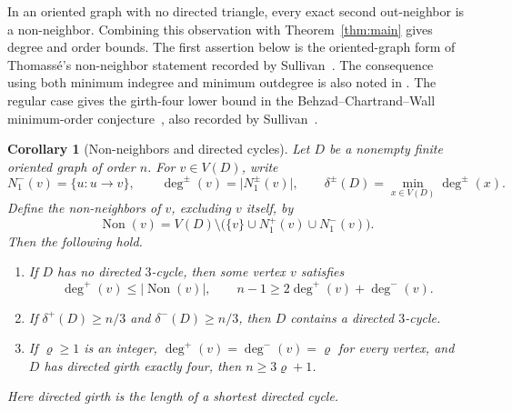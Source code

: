 \documentclass[11pt]{article}
\newtheorem{corollary}[theorem]{Corollary}
\theoremstyle{remark}
\newcommand{\abs}[1]{\lvert #1\rvert}
\DeclareMathOperator{\Non}{Non}
\begin{document}
In an oriented graph with no directed triangle, every exact second
out-neighbor is a non-neighbor. Combining this observation with
Theorem~\ref{thm:main} gives degree and order bounds.
The first assertion below is the oriented-graph form of Thomass\'e's
non-neighbor statement recorded by
Sullivan~\cite[Conjecture~6.12]{Sullivan2006}.
The consequence using both minimum indegree and minimum outdegree is also
noted in \cite[Section~3]{Sullivan2006}. The regular case gives the
girth-four lower bound in the Behzad--Chartrand--Wall minimum-order
conjecture~\cite{BehzadChartrandWall1970}, also recorded by
Sullivan~\cite[Section~4]{Sullivan2006}.

\begin{corollary}[Non-neighbors and directed cycles]\label{cor:directed-cycle-consequences}
Let \(D\) be a nonempty finite oriented graph of order \(n\). For
\(v\in V(D)\), write
\[
 N_1^-(v)=\{u:u\to v\},\qquad
 \deg^\pm(v)=\abs{N_1^\pm(v)},\qquad
 \delta^\pm(D)=\min_{x\in V(D)}\deg^\pm(x).
\]
Define the non-neighbors of \(v\), excluding \(v\) itself, by
\[
 \Non(v)=V(D)\setminus
 \bigl(\{v\}\cup N_1^+(v)\cup N_1^-(v)\bigr).
\]
Then the following hold.
\begin{enumerate}[label=\textup{(\roman*)}]
\item If \(D\) has no directed \(3\)-cycle, then some vertex \(v\) satisfies
\[
 \deg^+(v)\leq\abs{\Non(v)},\qquad
 n-1\geq 2\deg^+(v)+\deg^-(v).
\]
\item If \(\delta^+(D)\geq n/3\) and \(\delta^-(D)\geq n/3\), then \(D\)
contains a directed \(3\)-cycle.
\item If \(\varrho\geq1\) is an integer, \(\deg^+(v)=\deg^-(v)=\varrho\) for
every vertex, and \(D\) has directed girth exactly four, then
\(n\geq3\varrho+1\).
\end{enumerate}
Here directed girth is the length of a shortest directed cycle.
\end{corollary}
\end{document}
